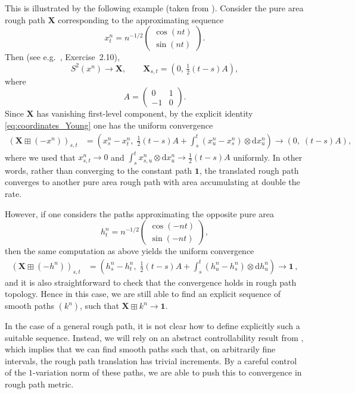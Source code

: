 \documentclass[12pt,a4paper]{article}
\numberwithin{equation}{section}
\theoremstyle{plain}
\theoremstyle{definition}
\theoremstyle{remark}
\begin{document}
This is illustrated by the following example (taken from \cite{Coutin07}). 
Consider the pure area rough path $\mathbf{X}$ corresponding to the 
approximating sequence
\[
x^n_t = n^{-1/2} \begin{pmatrix} \cos(nt) \\ \sin(nt) \end{pmatrix}.
\]
Then (see e.g.\ \cite{frizbook}, Exercise~2.10),
\[
S^2(x^n) \to \mathbf{X}, \qquad \mathbf{X}_{s,t} = \left(0,\,\tfrac{1}{2}(t-s)A\right),
\]
where
\[
A = \begin{pmatrix} 0 & 1 \\ -1 & 0 \end{pmatrix}.
\]
Since $\mathbf{X}$ has vanishing first-level component, by the explicit identity \eqref{eq:coordinates_Young} one has the uniform convergence
\begin{align*}
(\mathbf{X} \boxplus (-x^n))_{s,t}
&= \left(x^n_{s}- x^n_{t},\; \tfrac{1}{2}(t-s)A + \int_s^t (x^n_{u}- x^n_{s}) \otimes \mathrm{d}x^n_u \right) \to  \left(0,\; (t-s)A \right),
\end{align*}
where we used that $x^n_{s,t} \to 0$  and $\int_s^t x^n_{s,u} \otimes \mathrm{d}x^n_u 
\to \tfrac{1}{2}(t-s)A$ uniformly. In other words, rather than  converging to the constant path $\mathbf{1}$, the translated rough path  converges to another pure area rough path with area accumulating at double 
the rate.

However, if one considers the paths approximating the opposite pure area
\[
{h}^n_t=n^{-1/2}\begin{pmatrix}
	\cos( - n t)\\
	\sin(- n t)
\end{pmatrix},
\]
then the same computation as above yields the uniform convergence
\begin{align*}
(\mathbf{X} \boxplus (-h^n))_{s,t}
&= \left(h^n_{s}- h^n_{t},\; \tfrac{1}{2}(t-s)A + \int_s^t (h^n_{u}- h^n_{s}) \otimes \mathrm{d}h^n_u \right)  \to  \mathbf{1}\,,
\end{align*}
and it is also straightforward to check that the convergence holds in rough path topology. Hence in this case, we are still able to find an explicit sequence of smooth paths $(k^n)$, such that $\mathbf{X} \boxplus k^n \to \mathbf 1$.

In the case of a general rough path, it is not clear how to define explicitly such a suitable sequence. Instead, we will rely on an abstract controllability result from \cite{Gassiat24}, which implies that we can find smooth paths such that, on arbitrarily fine intervals, the rough path translation has trivial increments. By a careful control of the $1$-variation norm of these paths, we are able to push this to convergence in rough path metric.
\end{document}
